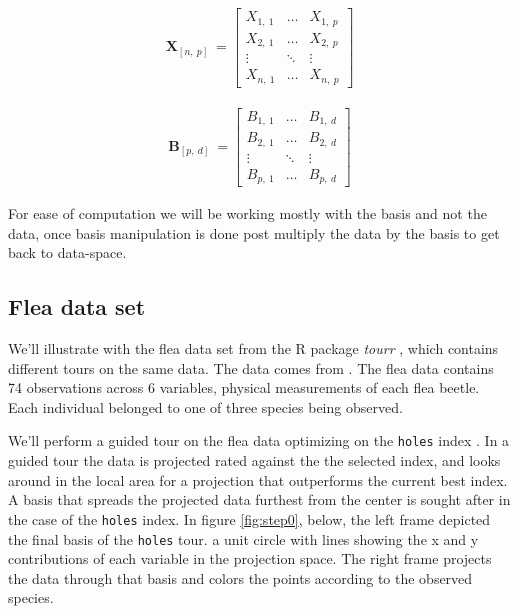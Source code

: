 \documentclass{monashthesis}
\begin{document}
\begin{align*}
  \textbf{X}_{[n,~p]} ~=
  \begin{bmatrix}
    X_{1,~1} & \dots  & X_{1,~p} \\
    X_{2,~1} & \dots  & X_{2,~p} \\
    \vdots   & \ddots & \vdots   \\
    X_{n,~1} & \dots  & X_{n,~p}
  \end{bmatrix}
\end{align*}

\begin{align*}
  \textbf{B}_{[p,~d]} ~=
  \begin{bmatrix}
    B_{1,~1} & \dots  & B_{1,~d} \\
    B_{2,~1} & \dots  & B_{2,~d} \\
    \vdots   & \ddots & \vdots   \\
    B_{p,~1} & \dots  & B_{p,~d}
  \end{bmatrix}
\end{align*}

For ease of computation we will be working mostly with the basis and not the data, once basis manipulation is done post multiply the data by the basis to get back to data-space.

\hypertarget{flea-data-set}{%
\subsection{Flea data set}\label{flea-data-set}}

We'll illustrate with the flea data set from the R package \emph{tourr} \autocite{wickham_tourr_2011}, which contains different tours on the same data. The data comes from \textcite{lubischew_use_1962}. The flea data contains 74 observations across 6 variables, physical measurements of each flea beetle. Each individual belonged to one of three species being observed.

We'll perform a guided tour on the flea data optimizing on the \texttt{holes} index \autocite{cook_interactive_2007}. In a guided tour the data is projected rated against the the selected index, and looks around in the local area for a projection that outperforms the current best index. A basis that spreads the projected data furthest from the center is sought after in the case of the \texttt{holes} index. In figure \ref{fig:step0}, below, the left frame depicted the final basis of the \texttt{holes} tour. a unit circle with lines showing the x and y contributions of each variable in the projection space. The right frame projects the data through that basis and colors the points according to the observed species.
\end{document}

